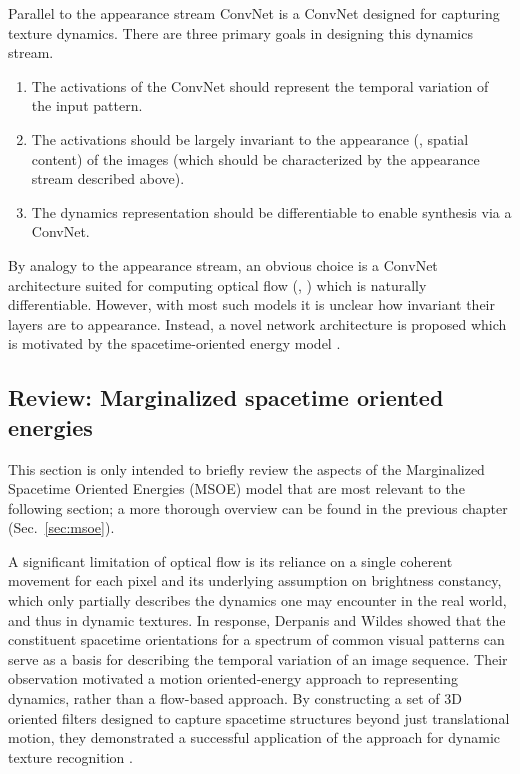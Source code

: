 Parallel to the appearance stream ConvNet is a ConvNet designed for capturing texture dynamics. There are three primary goals in designing this dynamics stream.
\begin{enumerate}
	\item The activations of the ConvNet should represent the temporal variation of the input pattern.
	\item The activations should be largely invariant to the appearance (\ie, spatial content) of the images (which should be characterized by the appearance stream described above).
	\item The dynamics representation should be differentiable to enable synthesis via a ConvNet.
\end{enumerate}

By analogy to the appearance stream, an obvious choice
is a ConvNet architecture suited for computing
optical flow (\eg, \cite{dosovitskiy2015,ilg2017}) which
is naturally differentiable.
However, with most such models it is unclear how invariant
their layers are to appearance.
Instead, a novel network architecture is proposed which is
motivated by the spacetime-oriented energy model
\cite{derpanis2012spacetime,simoncelli1998}.

\subsection{Review: Marginalized spacetime oriented energies}

 This section is only intended to briefly review the aspects of the Marginalized Spacetime Oriented Energies (MSOE) model \cite{derpanis2012spacetime} that are most relevant to the following section; a more thorough overview can be found in the previous chapter (Sec.\ \ref{sec:msoe}).

A significant limitation of optical flow is its reliance on a single coherent movement for each pixel and its underlying assumption on brightness constancy, which only partially describes the dynamics one may encounter in the real world, and thus in dynamic textures. In response, Derpanis and Wildes \cite{derpanis2012spacetime} showed that the constituent
spacetime orientations for a spectrum of common
visual patterns can serve as a basis for describing the temporal
variation of an image sequence. Their observation motivated a motion oriented-energy approach to representing dynamics, rather than a flow-based approach. By constructing a set of 3D oriented filters designed to capture spacetime structures beyond just translational motion, they demonstrated a successful application of the approach for dynamic texture recognition \cite{derpanis2012spacetime}.


